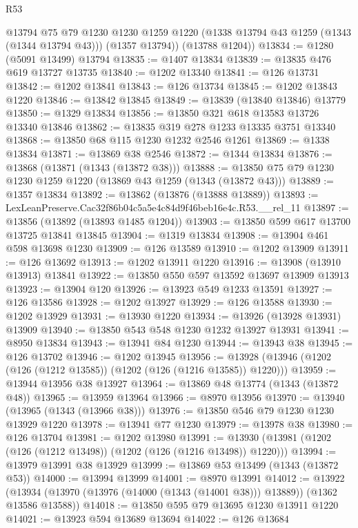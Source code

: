 \begin{lexlean}{R53}
\begin{coremodule}
        @13794
        @75
        @79
        @1230
        @1230
        @1259
        @1220
        (@1338 @13794 @43 @1259 (@1343 (@1344 @13794 @43)))
        (@1357 @13794))
      (@13788 @1204))
@13834 := @1280 (@5091 @13499) @13794
@13835 := @1407 @13834
@13839 := @13835 @476 @619 @13727 @13735
@13840 := @1202 @13340
@13841 := @126 @13731
@13842 := @1202 @13841
@13843 := @126 @13734
@13845 := @1202 @13843 @1220
@13846 := @13842 @13845
@13849 := @13839 (@13840 @13846) @13779
@13850 := @1329 @13834
@13856 := @13850 @321 @618 @13583 @13726 @13340 @13846
@13862 := @13835 @319 @278 @1233 @13335 @3751 @13340
@13868 := @13850 @68 @115 @1230 @1232 @2546 @1261
@13869 := @1338 @13834
@13871 := @13869 @38 @2546
@13872 := @1344 @13834
@13876 := @13868 (@13871 (@1343 (@13872 @38)))
@13888 := @13850 @75 @79 @1230 @1230 @1259 @1220 (@13869 @43 @1259 (@1343 (@13872 @43)))
@13889 := @1357 @13834
@13892 := @13862 (@13876 (@13888 @13889))
@13893 := LexLeanPreserve.Cac32f86b04c5a5e4c84d9f46beb16e4c.R53.__rel_11
@13897 := @13856 (@13892 (@13893 @1485 @1204))
@13903 := @13850 @599 @617 @13700 @13725 @13841 @13845
@13904 := @1319 @13834
@13908 := @13904 @461 @598 @13698 @1230
@13909 := @126 @13589
@13910 := @1202 @13909
@13911 := @126 @13692
@13913 := @1202 @13911 @1220
@13916 := @13908 (@13910 @13913) @13841
@13922 := @13850 @550 @597 @13592 @13697 @13909 @13913
@13923 := @13904 @120
@13926 := @13923 @549 @1233 @13591
@13927 := @126 @13586
@13928 := @1202 @13927
@13929 := @126 @13588
@13930 := @1202 @13929
@13931 := @13930 @1220
@13934 := @13926 (@13928 @13931) @13909
@13940 := @13850 @543 @548 @1230 @1232 @13927 @13931
@13941 := @8950 @13834
@13943 := @13941 @84 @1230
@13944 := @13943 @38
@13945 := @126 @13702
@13946 := @1202 @13945
@13956 := @13928 (@13946 (@1202 (@126 (@1212 @13585)) (@1202 (@126 (@1216 @13585)) @1220)))
@13959 := @13944 @13956 @38 @13927
@13964 := @13869 @48 @13774 (@1343 (@13872 @48))
@13965 := @13959 @13964
@13966 := @8970 @13956
@13970 := @13940 (@13965 (@1343 (@13966 @38)))
@13976 := @13850 @546 @79 @1230 @1230 @13929 @1220
@13978 := @13941 @77 @1230
@13979 := @13978 @38
@13980 := @126 @13704
@13981 := @1202 @13980
@13991 := @13930 (@13981 (@1202 (@126 (@1212 @13498)) (@1202 (@126 (@1216 @13498)) @1220)))
@13994 := @13979 @13991 @38 @13929
@13999 := @13869 @53 @13499 (@1343 (@13872 @53))
@14000 := @13994 @13999
@14001 := @8970 @13991
@14012 := @13922
    (@13934 (@13970 (@13976 (@14000 (@1343 (@14001 @38))) @13889)) (@1362 @13586 @13588))
@14018 := @13850 @595 @79 @13695 @1230 @13911 @1220
@14021 := @13923 @594 @13689 @13694
@14022 := @126 @13684

\end{coremodule}
\end{lexlean}
